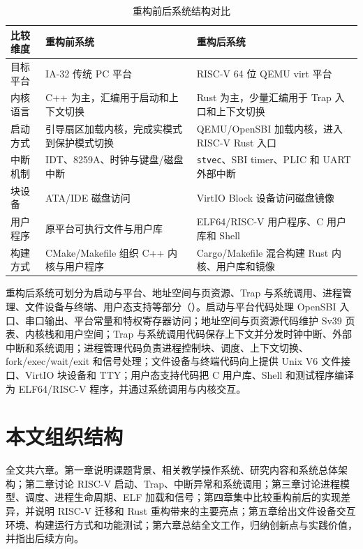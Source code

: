 \begin{table}[htbp]
  \centering
  \caption{重构前后系统结构对比}\label{tab:system-before-after}
  \renewcommand{\arraystretch}{1.35}
  \begin{tabular}{p{}p{}p{}}
    \toprule
    比较维度 & 重构前系统 & 重构后系统 \\
    \midrule
    目标平台 & IA-32 传统 PC 平台 & RISC-V 64 位 QEMU virt 平台 \\
    内核语言 & C++ 为主，汇编用于启动和上下文切换 & Rust 为主，少量汇编用于 Trap 入口和上下文切换 \\
    启动方式 & 引导扇区加载内核，完成实模式到保护模式切换 & QEMU/OpenSBI 加载内核，进入 RISC-V Rust 入口 \\
    中断机制 & IDT、8259A、时钟与键盘/磁盘中断 & \texttt{stvec}、SBI timer、PLIC 和 UART 外部中断 \\
    块设备 & ATA/IDE 磁盘访问 & VirtIO Block 设备访问磁盘镜像 \\
    用户程序 & 原平台可执行文件与用户库 & ELF64/RISC-V 用户程序、C 用户库和 Shell \\
    构建方式 & CMake/Makefile 组织 C++ 内核与用户程序 & Cargo/Makefile 混合构建 Rust 内核、用户库和镜像 \\
    \bottomrule
  \end{tabular}
\end{table}

重构后系统可划分为启动与平台、地址空间与页资源、Trap 与系统调用、进程管理、文件设备与终端、用户态支持等部分（）。启动与平台代码处理 OpenSBI 入口、串口输出、平台常量和特权寄存器访问；地址空间与页资源代码维护 Sv39 页表、内核栈和用户空间；Trap 与系统调用代码保存上下文并分发时钟中断、外部中断和系统调用；进程管理代码负责进程控制块、调度、上下文切换、fork/exec/wait/exit 和信号处理；文件设备与终端代码向上提供 Unix V6 文件接口、VirtIO 块设备和 TTY；用户态支持代码把 C 用户库、Shell 和测试程序编译为 ELF64/RISC-V 程序，并通过系统调用与内核交互。

\section{本文组织结构}

全文共六章。第一章说明课题背景、相关教学操作系统、研究内容和系统总体架构；第二章讨论 RISC-V 启动、Trap、中断异常和系统调用；第三章讨论进程模型、调度、进程生命周期、ELF 加载和信号；第四章集中比较重构前后的实现差异，并说明 RISC-V 迁移和 Rust 重构带来的主要亮点；第五章给出文件设备交互环境、构建运行方式和功能测试；第六章总结全文工作，归纳创新点与实践价值，并指出后续方向。
